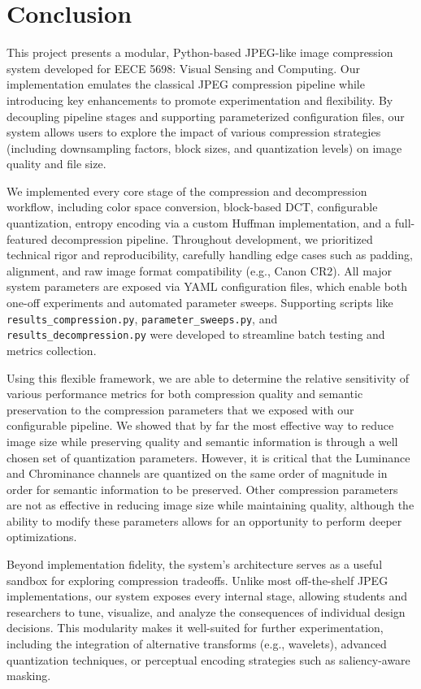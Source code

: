 \section{Conclusion}
\label{sec:conclusion}

This project presents a modular, Python-based JPEG-like image compression system developed for EECE 5698: Visual Sensing and Computing. Our implementation emulates the classical JPEG compression pipeline while introducing key enhancements to promote experimentation and flexibility. By decoupling pipeline stages and supporting parameterized configuration files, our system allows users to explore the impact of various compression strategies (including downsampling factors, block sizes, and quantization levels) on image quality and file size.

We implemented every core stage of the compression and decompression workflow, including color space conversion, block-based DCT, configurable quantization, entropy encoding via a custom Huffman implementation, and a full-featured decompression pipeline. Throughout development, we prioritized technical rigor and reproducibility, carefully handling edge cases such as padding, alignment, and raw image format compatibility (e.g., Canon CR2). All major system parameters are exposed via YAML configuration files, which enable both one-off experiments and automated parameter sweeps. Supporting scripts like \texttt{results\_compression.py}, \texttt{parameter\_sweeps.py}, and \texttt{results\_decompression.py} were developed to streamline batch testing and metrics collection.

Using this flexible framework, we are able to determine the relative sensitivity of various performance metrics for both compression quality and semantic preservation to the compression parameters that we exposed with our configurable pipeline. We showed that by far the most effective way to reduce image size while preserving quality and semantic information is through a well chosen set of quantization parameters. However, it is critical that the Luminance and Chrominance channels are quantized on the same order of magnitude in order for semantic information to be preserved. Other compression parameters are not as effective in reducing image size while maintaining quality, although the ability to modify these parameters allows for an opportunity to perform deeper optimizations.

Beyond implementation fidelity, the system’s architecture serves as a useful sandbox for exploring compression tradeoffs. Unlike most off-the-shelf JPEG implementations, our system exposes every internal stage, allowing students and researchers to tune, visualize, and analyze the consequences of individual design decisions. This modularity makes it well-suited for further experimentation, including the integration of alternative transforms (e.g., wavelets), advanced quantization techniques, or perceptual encoding strategies such as saliency-aware masking.

